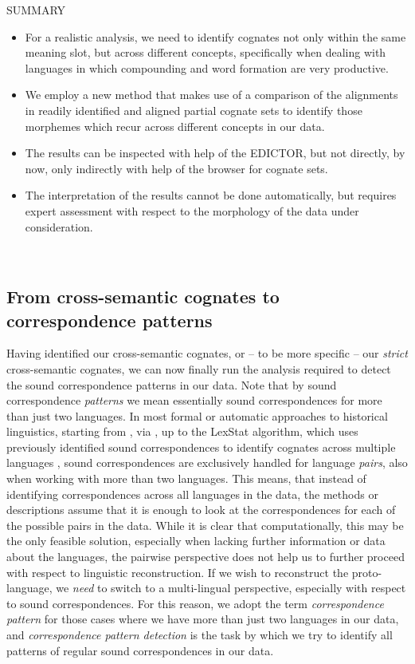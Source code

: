 \documentclass[xetex,svgnames]{scrartcl}
\begin{document}
\begin{center}
  \hline
  SUMMARY \\\hline
  \begin{itemize}
    \item For a realistic analysis, we need to identify cognates not only within the same meaning
      slot, but across different concepts, specifically when dealing with languages in which
      compounding and word formation are very productive.
    \item We employ a new method that makes use of a comparison of the alignments in readily
      identified and aligned partial cognate sets to identify those morphemes which recur across
      different concepts in our data.
    \item The results can be inspected with help of the EDICTOR, but not directly, by now, only
      indirectly with help of the browser for cognate sets.
    \item The interpretation of the results cannot be done automatically, but requires expert
      assessment with respect to the morphology of the data under consideration.
  \end{itemize}\\\hline
  \endtabular
\end{center}


\subsection{From cross-semantic cognates to correspondence patterns}
Having identified our cross-semantic cognates, or -- to be more specific -- our \emph{strict}
cross-semantic cognates, we can now finally run the analysis required to detect the sound
correspondence patterns in our data. Note that by sound correspondence \emph{patterns} we mean
essentially sound correspondences for more than just two languages. In most formal or automatic
approaches to historical linguistics, starting from \citet{Hoenigswald1960}, via
\citep{Kondrak2003}, up to the LexStat algorithm, which uses previously identified sound
correspondences to identify cognates across multiple languages \citep{List2012b}, sound
correspondences are exclusively handled for language \emph{pairs}, also when working with more than
two languages. This means, that instead of identifying correspondences across all languages in the
data, the methods or descriptions assume that it is enough to look at the correspondences for each
of the possible pairs in the data. While it is clear that computationally, this may be the only
feasible solution, especially when lacking further information or data about the languages, the
pairwise perspective does not help us to further proceed with respect to linguistic reconstruction.
If we wish to reconstruct the proto-language, we \emph{need} to switch to a multi-lingual
perspective, especially with respect to sound correspondences. For this reason, we adopt the term
\emph{correspondence pattern} for those cases where we have more than just two languages in our
data, and \emph{correspondence pattern detection} is the task by which we try to identify all
patterns of regular sound correspondences in our data. 
 
\end{document}

